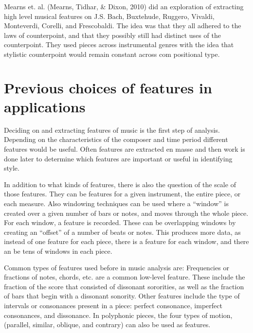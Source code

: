 \documentclass[12pt,twoside]{reedthesis}
\theoremstyle{definition}
\theoremstyle{definition}
\theoremstyle{definition}
\theoremstyle{remark}
\begin{document}
Mearns et. al. (Mearns, Tidhar, \& Dixon, 2010) did an exploration of
extracting high level musical features on J.S. Bach, Buxtehude, Ruggero,
Vivaldi, Monteverdi, Corelli, and Frescobaldi. The idea was that they
all adhered to the laws of counterpoint, and that they possibly still
had distinct uses of the counterpoint. They used pieces across
instrumental genres with the idea that stylistic counterpoint would
remain constant across com positional type.

\section{Previous choices of features in
applications}\label{previous-choices-of-features-in-applications}

Deciding on and extracting features of music is the first step of
analysis. Depending on the characteristics of the composer and time
period different features would be useful. Often features are extracted
en masse and then work is done later to determine which features are
important or useful in identifying style.

In addition to what kinds of features, there is also the question of the
scale of those features. They can be features for a given instrument,
the entire piece, or each measure. Also windowing techniques can be used
where a ``window'' is created over a given number of bars or notes, and
moves through the whole piece. For each window, a feature is recorded.
These can be overlapping windows by creating an ``offset'' of a number
of beats or notes. This produces more data, as instead of one feature
for each piece, there is a feature for each window, and there an be tens
of windows in each piece.

Common types of features used before in music analysis are: Frequencies
or fractions of notes, chords, etc. are a common low-level feature.
These include the fraction of the score that consisted of dissonant
sororities, as well as the fraction of bars that begin with a dissonant
sonority. Other features include the type of intervals or consonances
present in a piece: perfect consonance, imperfect consonances, and
dissonance. In polyphonic pieces, the four types of motion, (parallel,
similar, oblique, and contrary) can also be used as features.
\end{document}
